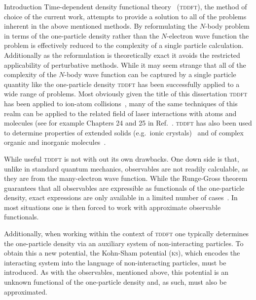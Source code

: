 \documentclass[letterpaper, 11 pt]{report}
\begin{document}
\begin{chapter}{Introduction \label{chap:intro}}
   Time-dependent density functional theory~\cite{tddft, ullrich} (\textsc{tddft}), the method of choice
   of the current work, attempts to provide a solution to all  of the problems inherent in the above
   mentioned methods. By reformulating the $N$-body problem in terms of the one-particle density rather
   than the $N$-electron wave function the problem is effectively reduced to the complexity of a single
   particle calculation. Additionally as the reformulation is theoretically exact it avoids the
   restricted applicability of perturbative methods. While it may seem strange that all of the
   complexity of the $N$-body wave function can be captured by a single particle quantity like the
   one-particle density \textsc{tddft} has been successfully applied to a wide range of problems. Most
   obviously given the title of this dissertation \textsc{tddft} has been applied to ion-atom
   collisions~\cite{bgm-rev}, many of the same techniques of this realm can be applied to the related
   field of laser interactions with atoms and molecules (see for example Chapters 24 and 25 in
   Ref.~\cite{tddft}. \textsc{tddft} has also been used to determine properties of extended solids
   (e.g.\ ionic crystals)~\cite{extRev} and of complex organic and inorganic molecules~\cite{qcRev}.

   While useful \textsc{tddft} is not with out its own drawbacks. One down side is that, unlike in
   standard quantum mechanics, observables are not readily calculable, as they are from the
   many-electron wave function. While the Runge-Gross theorem~\cite{rgt} guarantees that all observables
   are expressible as functionals of the one-particle density, exact expressions are only available in a
   limited number of cases~\cite{obs_exac}. In most situations one is then forced to work with
   approximate observable functionals.

   Additionally, when working within the context of \textsc{tddft} one typically determines the
   one-particle density via an auxiliary system of non-interacting particles. To obtain this a new
   potential, the Kohn-Sham potential (\textsc{ks}), which encodes the interacting system into the
   language of non-interacting particles, must be introduced. As with the observables, mentioned above,
   this potential is an unknown functional of the one-particle density and, as such, must also be
   approximated.


\end{chapter}
\end{document}
